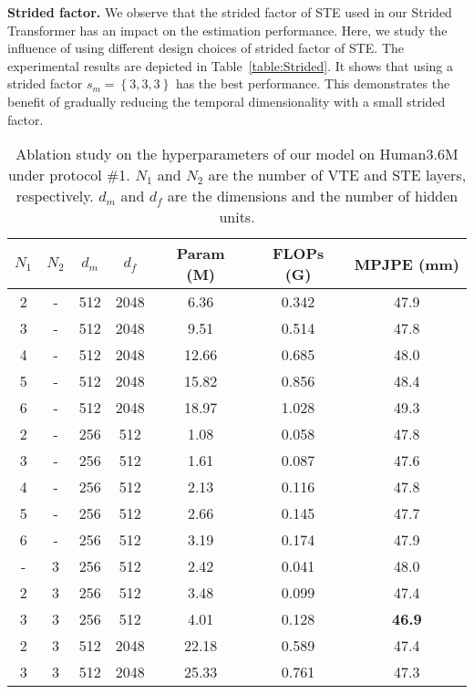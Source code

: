 \documentclass[journal]{IEEEtran}
\begin{document}
\textbf{Strided factor.}
We observe that the strided factor of STE used in our Strided Transformer has an impact on the estimation performance. 
Here, we study the influence of using different design choices of strided factor of STE. 
The experimental results are depicted in Table~\ref{table:Strided}.
It shows that using a strided factor $s_m = \left\{3, 3, 3\right\}$ has the best performance. 
This demonstrates the benefit of gradually reducing the temporal dimensionality with a small strided factor. 

\begin{table}[tb]
   \centering
   \caption
   {
      Ablation study on the hyperparameters of our model on Human3.6M under protocol \#1. 
      $N_{1}$ and $N_{2}$ are the number of VTE and STE layers, respectively. 
      $d_{m}$ and $d_{f}$ are the dimensions and the number of hidden units. 
   }
   \setlength{\tabcolsep}{1.8mm} 
   \begin{tabular}{ccccccc}
   \toprule  [1pt]
   $N_{1}$ &$N_{2}$ &$d_{m}$ &$d_{f}$ &Param (M) &FLOPs (G)  &MPJPE (mm)\\
   \midrule  [0.5pt]
   2 &- &512 &2048 &6.36 &0.342  &47.9 \\
   3 &- &512 &2048 &9.51 &0.514  &47.8 \\
   4 &- &512 &2048 &12.66 &0.685 &48.0 \\
   5 &- &512 &2048 &15.82 &0.856 &48.4 \\
   6 &- &512 &2048 &18.97 &1.028 &49.3 \\
   \midrule [0.5pt]  

   2 &- &256 &512 &1.08 &0.058 &47.8 \\
   3 &- &256 &512 &1.61 &0.087 &47.6 \\
   4 &- &256 &512 &2.13 &0.116 &47.8 \\
   5 &- &256 &512 &2.66 &0.145 &47.7 \\
   6 &- &256 &512 &3.19 &0.174 &47.9 \\
   \midrule [0.5pt]  

   - &3 &256 &512 &2.42 &0.041 &48.0 \\
   2 &3 &256 &512 &3.48 &0.099 &47.4 \\
   3 &3 &256 &512 &4.01 &0.128 &\textbf{46.9} \\
   2 &3 &512 &2048 &22.18 &0.589 &47.4 \\
   3 &3 &512 &2048 &25.33 &0.761 &47.3 \\
   \toprule  [1.0pt] 
   \end{tabular}
\label{table:hyperparameters}
\end{table}
\end{document}
